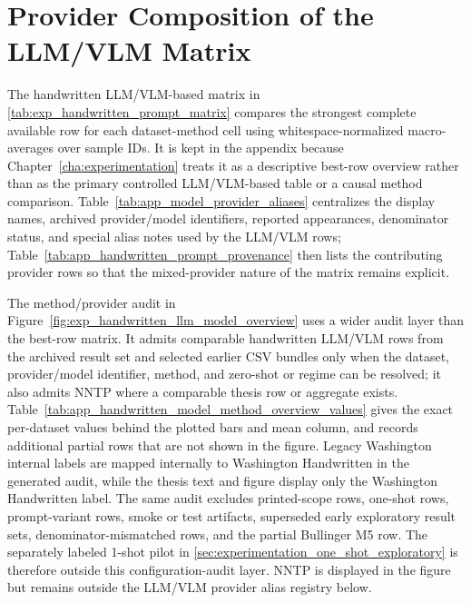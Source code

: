 \FloatBarrier

\section{Provider Composition of the LLM/VLM Matrix}
\label{sec:appendix_provider_mix}

The handwritten LLM/VLM-based matrix in \autoref{tab:exp_handwritten_prompt_matrix} compares the strongest complete available row for each dataset-method cell using whitespace-normalized \LANormCombined{} macro-averages over sample IDs. It is kept in the appendix because Chapter~\ref{cha:experimentation} treats it as a descriptive best-row overview rather than as the primary controlled LLM/VLM-based table or a causal method comparison. Table~\ref{tab:app_model_provider_aliases} centralizes the display names, archived provider/model identifiers, reported appearances, denominator status, and special alias notes used by the LLM/VLM rows; Table~\ref{tab:app_handwritten_prompt_provenance} then lists the contributing provider rows so that the mixed-provider nature of the matrix remains explicit.

The method/provider audit in Figure~\ref{fig:exp_handwritten_llm_model_overview} uses a wider audit layer than the best-row matrix. It admits comparable handwritten LLM/VLM rows from the archived result set and selected earlier CSV bundles only when the dataset, provider/model identifier, method, and zero-shot or \contextHundred{} regime can be resolved; it also admits NNTP where a comparable thesis row or aggregate exists. Table~\ref{tab:app_handwritten_model_method_overview_values} gives the exact per-dataset values behind the plotted bars and mean column, and records additional partial rows that are not shown in the figure. Legacy Washington internal labels are mapped internally to Washington Handwritten in the generated audit, while the thesis text and figure display only the Washington Handwritten label. The same audit excludes printed-scope rows, one-shot rows, prompt-variant rows, smoke or test artifacts, superseded early exploratory result sets, denominator-mismatched rows, and the partial Bullinger \QwenThirtyTwoShort{} M5 row. The separately labeled 1-shot pilot in \autoref{sec:experimentation_one_shot_exploratory} is therefore outside this configuration-audit layer. NNTP is displayed in the figure but remains outside the LLM/VLM provider alias registry below.

